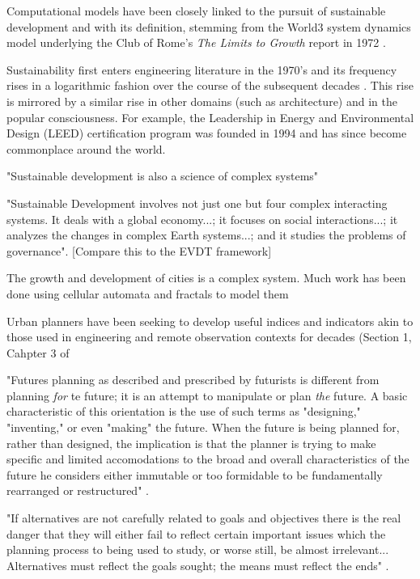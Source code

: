 Computational models have been closely linked to the pursuit of sustainable development and with its definition, stemming from the World3 system dynamics model underlying the Club of Rome's \textit{The Limits to Growth} report in 1972 \cite{meadowsLimitsGrowth1972}.

Sustainability first enters engineering literature in the 1970's and its frequency rises in a logarithmic fashion over the course of the subsequent decades \cite{deweckInvestigatingRelationshipsSemantic2012}. This rise is mirrored by a similar rise in other domains (such as architecture) and in the popular consciousness. For example, the Leadership in Energy and Environmental Design (LEED) certification program was founded in 1994 and has since become commonplace around the world.

"Sustainable development is also a science of complex systems" \cite{sachsAgeSustainableDevelopment2015}

"Sustainable Development involves not just one but four complex interacting systems. It deals with a global economy...; it focuses on social interactions...; it analyzes the changes in complex Earth systems...; and it studies the problems of governance". \cite{sachsAgeSustainableDevelopment2015} [Compare this to the EVDT framework]

The growth and development of cities is a complex system. Much work has been done using cellular automata and fractals to model them \cite{battyCitiesComplexity2005}

Urban planners have been seeking to develop useful indices and indicators akin to those used in engineering and remote observation contexts for decades (Section 1, Cahpter 3 of \cite{boyceFrameworkDefiningApplying1972}


"Futures planning as described and prescribed by futurists is different from planning \textit{for} te future; it is an attempt to manipulate or plan \textit{the} future. A basic characteristic of this orientation is the use of such terms as "designing," "inventing," or even "making" the future. When the future is being planned for, rather than designed, the implication is that the planner is trying to make specific and limited accomodations to the broad and overall characteristics of the future he considers either immutable or too formidable to be fundamentally rearranged or restructured" \cite{robinsonDecisionmakingUrbanPlanning1972}.

"If alternatives are not carefully related to goals and objectives there is the real danger that they will either fail to reflect certain important issues which the planning process to being used to study, or worse still, be almost irrelevant... Alternatives must reflect the goals sought; the means must reflect the ends" \cite{mcloughlinChartingPossibleCourses1972}.



